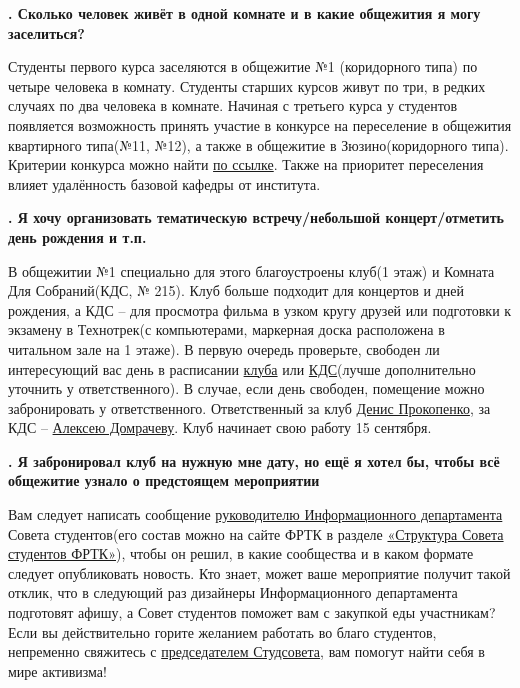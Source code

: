 \documentclass[14pt]{extarticle}
\newcounter{question}
\newcommand\Que[1]{%
    \begin{minipage}{\textwidth}
    \leavevmode\par
    \stepcounter{question}
    \noindent
    {\large\textbf{\thequestion. #1}}\par}
\newcommand\Ans[2][]{%
    \leavevmode\par\noindent
    {\leftskip37pt
    \textbf{#1}#2\par}
    \end{minipage}}
\begin{document}
\Que{Сколько человек живёт в одной комнате и в какие общежития я могу заселиться?}
\Ans{Студенты первого курса заселяются в общежитие №1 (коридорного типа) по четыре человека в комнату. Студенты старших курсов живут по три, в редких случаях по два человека в комнате. Начиная с третьего курса у студентов появляется возможность принять участие в конкурсе на переселение в общежития квартирного типа(№11, №12), а также в общежитие в Зюзино(коридорного типа). Критерии конкурса можно найти \href{https://vk.com/doc116785758_468418381?hash=e3806c233e5d8a209e&dl=2c9c9e3c50646496bc}{по ссылке}. Также на приоритет переселения влияет удалённость базовой кафедры от института.}

\Que{Я хочу организовать тематическую встречу/небольшой концерт/отметить день рождения и т.п.}
\Ans{В общежитии №1 специально для этого благоустроены клуб(1 этаж) и Комната Для Собраний(КДС, № 215). Клуб больше подходит для концертов и дней рождения, а КДС -- для просмотра фильма в узком кругу друзей или подготовки к экзамену в Технотрек(с компьютерами, маркерная доска расположена в читальном зале на 1 этаже). В первую очередь проверьте, свободен ли интересующий вас день в расписании \href{https://calendar.google.com/calendar/embed?src=ffse5gki3k4f9j266789sbj5ns@group.calendar.google.com&ctz=Europe/Moscow}{клуба} или \href{https://frtk.mipt.ru/services/meeting/}{КДС}(лучше дополнительно уточнить у ответственного). В случае, если день свободен, помещение можно забронировать у ответственного. Ответственный за клуб \href{https://vk.com/denproc}{Денис Прокопенко}, за КДС -- \href{https://vk.com/domrachev_alexey}{Алексею Домрачеву}. Клуб начинает свою работу 15 сентября.}

\Que{Я забронировал клуб на нужную мне дату, но ещё я хотел бы, чтобы всё общежитие узнало о предстоящем мероприятии}
\Ans{Вам следует написать сообщение \href{https://vk.com/danya_goes_ahead}{руководителю Информационного департамента} Совета студентов(его состав можно на сайте ФРТК в разделе \href{https://mipt.ru/drec/forstudents/studsovet/structure.php}{«Структура Совета студентов ФРТК»}), чтобы он решил, в какие сообщества и в каком формате следует опубликовать новость. Кто знает, может ваше мероприятие получит такой отклик, что в следующий раз дизайнеры Информационного департамента подготовят афишу, а Совет студентов поможет вам с закупкой еды участникам? Если вы действительно горите желанием работать во благо студентов, непременно свяжитесь с \href{https://vk.com/philalala}{председателем Студсовета}, вам помогут найти себя в мире активизма!}
\end{document}
